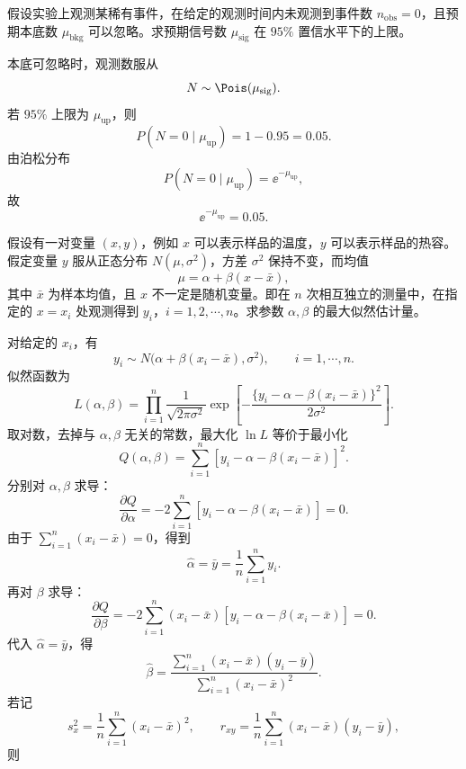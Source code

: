\begin{question}
假设实验上观测某稀有事件，在给定的观测时间内未观测到事件数 $n_{\mathrm{obs}}=0$，且预期本底数 $\mu_{\mathrm{bkg}}$ 可以忽略。求预期信号数 $\mu_{\mathrm{sig}}$ 在 $95\%$ 置信水平下的上限。
\begin{solution}
本底可忽略时，观测数服从
\[
N\sim \Pois(\mu_{\mathrm{sig}}).
\]
若 $95\%$ 上限为 $\mu_{\mathrm{up}}$，则
\[
P(N=0\mid \mu_{\mathrm{up}})=1-0.95=0.05.
\]
由泊松分布
\[
P(N=0\mid \mu_{\mathrm{up}})=\ee^{-\mu_{\mathrm{up}}},
\]
故
\[
\ee^{-\mu_{\mathrm{up}}}=0.05.
\]

\end{solution}
\end{question}

\begin{question}
假设有一对变量 $(x,y)$，例如 $x$ 可以表示样品的温度，$y$ 可以表示样品的热容。假定变量 $y$ 服从正态分布 $N(\mu,\sigma^2)$，方差 $\sigma^2$ 保持不变，而均值
\[
\mu=\alpha+\beta(x-\bar x),
\]
其中 $\bar x$ 为样本均值，且 $x$ 不一定是随机变量。即在 $n$ 次相互独立的测量中，在指定的 $x=x_i$ 处观测得到 $y_i$，$i=1,2,\cdots,n$。求参数 $\alpha,\beta$ 的最大似然估计量。
\begin{solution}
对给定的 $x_i$，有
\[
y_i\sim N\bigl(\alpha+\beta(x_i-\bar x),\sigma^2\bigr),
\qquad i=1,\cdots,n.
\]
似然函数为
\[
L(\alpha,\beta)=\prod_{i=1}^n
\frac{1}{\sqrt{2\pi\sigma^2}}
\exp\left[-\frac{\{y_i-\alpha-\beta(x_i-\bar x)\}^2}{2\sigma^2}\right].
\]
取对数，去掉与 $\alpha,\beta$ 无关的常数，最大化 $\ln L$ 等价于最小化
\[
Q(\alpha,\beta)=\sum_{i=1}^n\left[y_i-\alpha-\beta(x_i-\bar x)\right]^2.
\]
分别对 $\alpha,\beta$ 求导：
\[
\frac{\partial Q}{\partial\alpha}
=-2\sum_{i=1}^n\left[y_i-\alpha-\beta(x_i-\bar x)\right]=0.
\]
由于 $\sum_{i=1}^n(x_i-\bar x)=0$，得到
\[
\hat\alpha=\bar y=\frac1n\sum_{i=1}^n y_i.
\]
再对 $\beta$ 求导：
\[
\frac{\partial Q}{\partial\beta}
=-2\sum_{i=1}^n(x_i-\bar x)
\left[y_i-\alpha-\beta(x_i-\bar x)\right]=0.
\]
代入 $\hat\alpha=\bar y$，得
\[
\hat\beta=\frac{\sum_{i=1}^n(x_i-\bar x)(y_i-\bar y)}
{\sum_{i=1}^n(x_i-\bar x)^2}.
\]
若记
\[
s_x^2=\frac1n\sum_{i=1}^n(x_i-\bar x)^2,
\qquad
r_{xy}=\frac1n\sum_{i=1}^n(x_i-\bar x)(y_i-\bar y),
\]
则
\end{solution}
\end{question}

